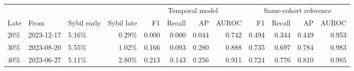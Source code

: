 \begin{tabular}{lllrrrrrrrrr}
\toprule
 & & & & \multicolumn{4}{c}{Temporal model} & \multicolumn{4}{c}{Same-cohort reference} \\
\cmidrule(lr){5-8} \cmidrule(lr){9-12}
Late & From & Sybil early & Sybil late & F1 & Recall & AP & AUROC & F1 & Recall & AP & AUROC \\
\midrule
20\% & 2023-12-17 & 5.16\% & 0.29\% & 0.000 & 0.000 & 0.044 & 0.742 & 0.494 & 0.344 & 0.449 & 0.953 \\
30\% & 2023-08-20 & 5.55\% & 1.02\% & 0.166 & 0.093 & 0.280 & 0.888 & 0.735 & 0.697 & 0.784 & 0.983 \\
40\% & 2023-06-27 & 5.11\% & 2.80\% & 0.213 & 0.143 & 0.256 & 0.911 & 0.724 & 0.776 & 0.810 & 0.985 \\
\bottomrule
\end{tabular}
